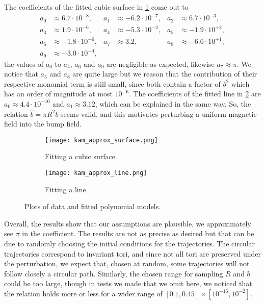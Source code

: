 The coefficients of the fitted cubic surface in \cref{subfig:3dfitting} come out to
\begin{align*}
a_0&\approx  6.7\cdot10^{-8},	&
a_1&\approx -6.2\cdot10^{-7},	&
a_2&\approx  6.7\cdot10^{-3},\\
a_3&\approx  1.9\cdot10^{-6},	&
a_4&\approx -5.3\cdot10^{-2},	&
a_5&\approx -1.9\cdot10^{+2},\\
a_6&\approx -1.8\cdot10^{-6},	&
a_7&\approx  3.2,				&
a_8&\approx  -6.6\cdot10^{+1},\\
a_9&\approx  -3.0\cdot10^{-4},
\end{align*} 
the values of $a_0$ to $a_4$, $a_6$ and $a_9$ are negligible as expected, likewise $a_7\approx\pi$. We notice that $a_5$ and $a_8$ are quite large but we reason that the contribution of their respective monomial term is still small, since both contain a factor of $b^2$ which has an order of magnitude at most $10^{-6}$. The coefficients of the fitted line in \cref{subfig:2dfitting} are $a_0\approx 4.4\cdot10^{-10}$ and $a_1\approx3.12$, which can be explained in the same way. So, the relation $\hat b =\pi R^2b$ seems valid, and this motivates perturbing a uniform magnetic field into the bump field.

\begin{figure}[!ht]
\centering
\begin{subfigure}[!th]{0.49\textwidth}
\texttt{[image: kam\_approx\_surface.png]}
\caption{Fitting a cubic surface}
\label{subfig:3dfitting}
\end{subfigure}
%
\begin{subfigure}[!th]{0.49\textwidth}
\centering
\texttt{[image: kam\_approx\_line.png]}
\caption{Fitting a line}
\label{subfig:2dfitting}
\end{subfigure}
\caption{Plots of data and fitted polynomial models.}
\label{fig:modeling}
\end{figure}


Overall, the results show that our assumptions are plausible, we approximately see $\pi$ in the coefficient. The results are not as precise as desired but that can be due to randomly choosing the initial conditions for the trajectories. The circular trajectories correspond to invariant tori, and since not all tori are preserved under the perturbation, we expect that, chosen at random, some trajectories will not follow closely a circular path. Similarly, the chosen range for sampling $R$ and $b$ could be too large, though in tests we made that we omit here, we noticed that the relation holds more or less for a wider range of $[0.1, 0.45]\times[10^{-16}, 10^{-2}]$. 

